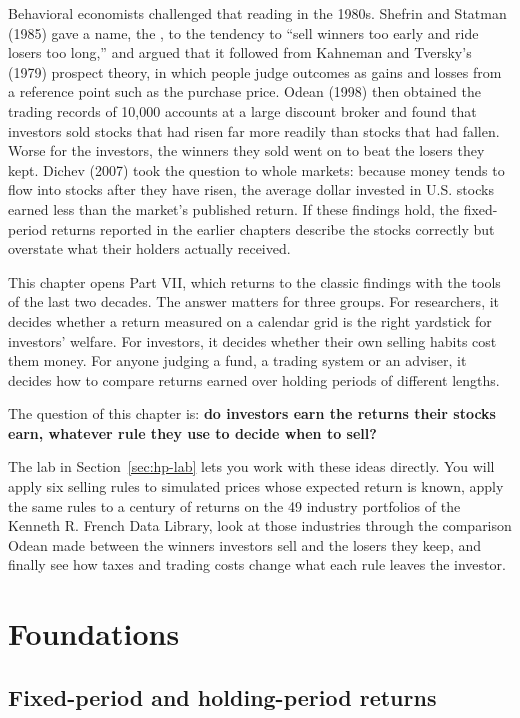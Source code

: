 Behavioral economists challenged that reading in the 1980s. Shefrin and Statman (1985) gave a name, the , to the tendency to ``sell winners too early and ride losers too long,'' and argued that it followed from Kahneman and Tversky's (1979) prospect theory, in which people judge outcomes as gains and losses from a reference point such as the purchase price. Odean (1998) then obtained the trading records of 10,000 accounts at a large discount broker and found that investors sold stocks that had risen far more readily than stocks that had fallen. Worse for the investors, the winners they sold went on to beat the losers they kept. Dichev (2007) took the question to whole markets: because money tends to flow into stocks after they have risen, the average dollar invested in U.S. stocks earned less than the market's published return. If these findings hold, the fixed-period returns reported in the earlier chapters describe the stocks correctly but overstate what their holders actually received.

This chapter opens Part VII, which returns to the classic findings with the tools of the last two decades. The answer matters for three groups. For researchers, it decides whether a return measured on a calendar grid is the right yardstick for investors' welfare. For investors, it decides whether their own selling habits cost them money. For anyone judging a fund, a trading system or an adviser, it decides how to compare returns earned over holding periods of different lengths. 

The question of this chapter is: \textbf{do investors earn the returns their stocks earn, whatever rule they use to decide when to sell?}

The lab in Section~\ref{sec:hp-lab} lets you work with these ideas directly. You will apply six selling rules to simulated prices whose expected return is known, apply the same rules to a century of returns on the 49 industry portfolios of the Kenneth R. French Data Library, look at those industries through the comparison Odean made between the winners investors sell and the losers they keep, and finally see how taxes and trading costs change what each rule leaves the investor.


\section{Foundations}
\label{sec:hp-foundations}

\subsection{Fixed-period and holding-period returns}

